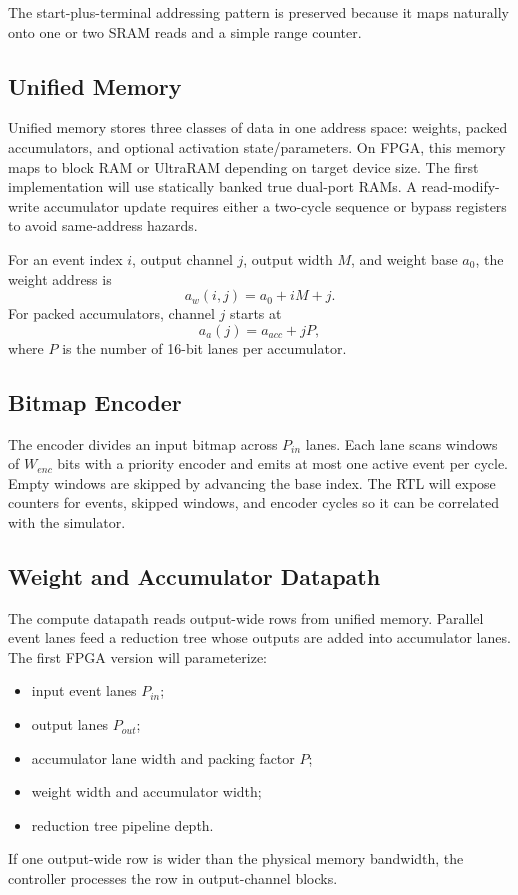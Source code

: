 \documentclass[10pt,conference]{IEEEtran}
\begin{document}
The start-plus-terminal addressing pattern is preserved because it maps naturally onto one or two SRAM reads and a simple range counter.

\subsection{Unified Memory}
Unified memory stores three classes of data in one address space: weights, packed accumulators, and optional activation state/parameters. On FPGA, this memory maps to block RAM or UltraRAM depending on target device size. The first implementation will use statically banked true dual-port RAMs. A read-modify-write accumulator update requires either a two-cycle sequence or bypass registers to avoid same-address hazards.

For an event index $i$, output channel $j$, output width $M$, and weight base $a_0$, the weight address is
\begin{equation}
    a_w(i,j)=a_0+iM+j.
\end{equation}
For packed accumulators, channel $j$ starts at
\begin{equation}
    a_a(j)=a_{acc}+jP,
\end{equation}
where $P$ is the number of 16-bit lanes per accumulator.

\subsection{Bitmap Encoder}
The encoder divides an input bitmap across $P_{in}$ lanes. Each lane scans windows of $W_{enc}$ bits with a priority encoder and emits at most one active event per cycle. Empty windows are skipped by advancing the base index. The RTL will expose counters for events, skipped windows, and encoder cycles so it can be correlated with the simulator.

\subsection{Weight and Accumulator Datapath}
The compute datapath reads output-wide rows from unified memory. Parallel event lanes feed a reduction tree whose outputs are added into accumulator lanes. The first FPGA version will parameterize:
\begin{itemize}
    \item input event lanes $P_{in}$;
    \item output lanes $P_{out}$;
    \item accumulator lane width and packing factor $P$;
    \item weight width and accumulator width;
    \item reduction tree pipeline depth.
\end{itemize}
If one output-wide row is wider than the physical memory bandwidth, the controller processes the row in output-channel blocks.
\end{document}
